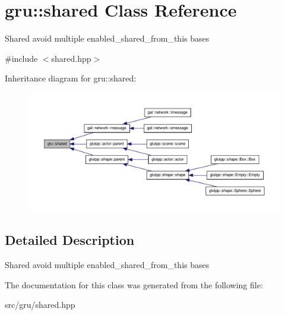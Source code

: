 \hypertarget{classgru_1_1shared}{\section{gru\-:\-:shared \-Class \-Reference}
\label{classgru_1_1shared}
}


\-Shared avoid multiple enabled\-\_\-shared\-\_\-from\-\_\-this bases  




{\ttfamily \#include $<$shared.\-hpp$>$}



\-Inheritance diagram for gru\-:\-:shared\-:
\nopagebreak
\begin{figure}[H]
\begin{center}
\leavevmode
\includegraphics[width=350pt]{classgru_1_1shared__inherit__graph}
\end{center}
\end{figure}


\subsection{\-Detailed \-Description}
\-Shared avoid multiple enabled\-\_\-shared\-\_\-from\-\_\-this bases 

\-The documentation for this class was generated from the following file\-:\begin{DoxyCompactItemize}
\item 
src/gru/shared.\-hpp\end{DoxyCompactItemize}
